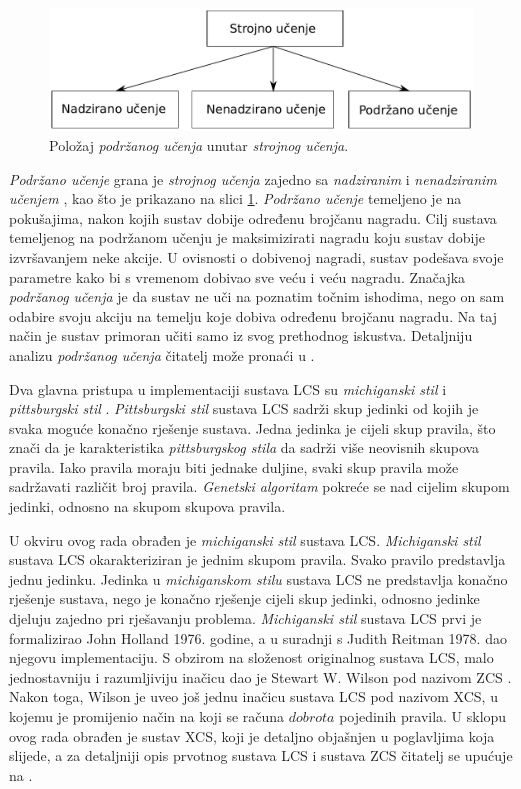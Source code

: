 \documentclass[times, utf8, zavrsni]{fer}
\begin{document}
\begin{figure}[!h]
    \centering
    \includegraphics[width=\textwidth]{img/ml.pdf}
    \caption{Položaj \emph{podržanog učenja} unutar \emph{strojnog učenja}.}
    \label{img:repol}
\end{figure}
\emph{Podržano učenje} grana je \emph{strojnog učenja}  zajedno sa \emph{nadziranim}  i \emph{nenadziranim učenjem} , kao što je prikazano na slici \ref{img:repol}.
\emph{Podržano učenje} temeljeno je na pokušajima, nakon kojih sustav dobije određenu brojčanu nagradu.
Cilj sustava temeljenog na podržanom učenju je maksimizirati nagradu koju sustav dobije izvršavanjem neke akcije.
U ovisnosti o dobivenoj nagradi, sustav podešava svoje parametre kako bi s vremenom dobivao sve veću i veću nagradu.
Značajka \emph{podržanog učenja} je da sustav ne uči na poznatim točnim ishodima, nego on sam odabire svoju akciju na temelju koje dobiva određenu brojčanu nagradu.
Na taj način je sustav primoran učiti samo iz svog prethodnog iskustva.
Detaljniju analizu \emph{podržanog učenja} čitatelj može pronaći u \citep{7}.

Dva glavna pristupa u implementaciji sustava LCS su \emph{michiganski stil}  i \emph{pittsburgski stil} .
\emph{Pittsburgski stil} sustava LCS sadrži skup jedinki od kojih je svaka moguće konačno rješenje sustava.
Jedna jedinka je cijeli skup pravila, što znači da je karakteristika \emph{pittsburgskog stila} da sadrži više neovisnih skupova pravila.
Iako pravila moraju biti jednake duljine, svaki skup pravila može sadržavati različit broj pravila.
\emph{Genetski algoritam} pokreće se nad cijelim skupom jedinki, odnosno na skupom skupova pravila.

U okviru ovog rada obrađen je \emph{michiganski stil} sustava LCS.
\emph{Michiganski stil} sustava LCS okarakteriziran je jednim skupom pravila.
Svako pravilo predstavlja jednu jedinku.
Jedinka u \emph{michiganskom stilu} sustava LCS ne predstavlja konačno rješenje sustava, nego je konačno rješenje cijeli skup jedinki, odnosno jedinke djeluju zajedno pri rješavanju problema.
\emph{Michiganski stil} sustava LCS prvi je formalizirao John Holland 1976. godine, a u suradnji s Judith Reitman 1978. dao njegovu implementaciju.
S obzirom na složenost originalnog sustava LCS, malo jednostavniju i razumljiviju inačicu dao je Stewart W. Wilson pod nazivom ZCS .
Nakon toga, Wilson je uveo još jednu inačicu sustava LCS pod nazivom XCS, u kojemu je promijenio način na koji se računa $dobrota$ pojedinih pravila.
U sklopu ovog rada obrađen je sustav XCS, koji je detaljno objašnjen u poglavljima koja slijede, a za detaljniji opis prvotnog sustava LCS i sustava ZCS čitatelj se upućuje na \citep{3}.
\end{document}
